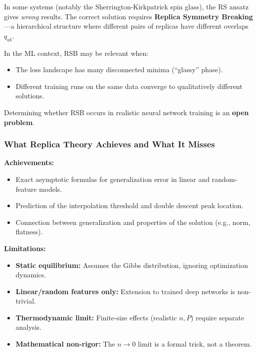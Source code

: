 \documentclass[
  journal=largetwo,
  year=2025,
  volume=37,
]{cup-journal}
\begin{document}
\begin{remark}
In some systems (notably the Sherrington-Kirkpatrick spin glass), the RS ansatz gives \textit{wrong} results. The correct solution requires \textbf{Replica Symmetry Breaking}---a hierarchical structure where different pairs of replicas have different overlaps $q_{ab}$.

In the ML context, RSB may be relevant when:
\begin{itemize}
    \item The loss landscape has many disconnected minima (``glassy'' phase).
    \item Different training runs on the same data converge to qualitatively different solutions.
\end{itemize}

Determining whether RSB occurs in realistic neural network training is an \textbf{open problem}.
\end{remark}

\subsubsection{What Replica Theory Achieves and What It Misses}

\textbf{Achievements:}
\begin{itemize}
    \item Exact asymptotic formulas for generalization error in linear and random-feature models.
    \item Prediction of the interpolation threshold and double descent peak location.
    \item Connection between generalization and properties of the solution (e.g., norm, flatness).
\end{itemize}

\textbf{Limitations:}
\begin{itemize}
    \item \textbf{Static equilibrium:} Assumes the Gibbs distribution, ignoring optimization dynamics.
    \item \textbf{Linear/random features only:} Extension to trained deep networks is non-trivial.
    \item \textbf{Thermodynamic limit:} Finite-size effects (realistic $n, P$) require separate analysis.
    \item \textbf{Mathematical non-rigor:} The $n \to 0$ limit is a formal trick, not a theorem.
\end{itemize}
\end{document}
